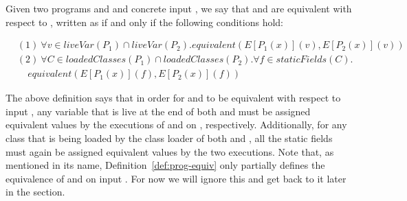 \documentclass[runningheads,a4paper]{llncs}
\begin{document}
\begin{definition}\label{def:prog-equiv}
  Given two programs  and  and concrete input ,
  we say that  and  are equivalent
  with respect to , written as 
  if and only if the following conditions hold:

\[
    \begin{aligned}
      & (1)~ \forall v\in liveVar(P_1)\cap liveVar(P_2). equivalent(E[P_1(x)](v), E[P_2(x)](v))\\
& (2)~  \forall C \in loadedClasses(P_1) \cap loadedClasses(P_2).\forall f \in staticFields(C).\\
  &  ~~~~~ equivalent(E[P_1(x)](f), E[P_2(x)](f))
    \end{aligned}
    \]
   
  \end{definition}

The above definition says that in order for  and
 to be equivalent with respect to input , any variable
that is live at the end of both  and  must be
assigned equivalent values by the executions of  and
 on , respectively.
Additionally, for any class that
is being loaded by the class loader of both  and ,
all the static fields must again be assigned equivalent values by the
two executions. %
Note that, as mentioned in its name, Definition~\ref{def:prog-equiv} only partially
defines the equivalence of  and  on input . For now
we will ignore this and get back to it later in the section.
\end{document}
